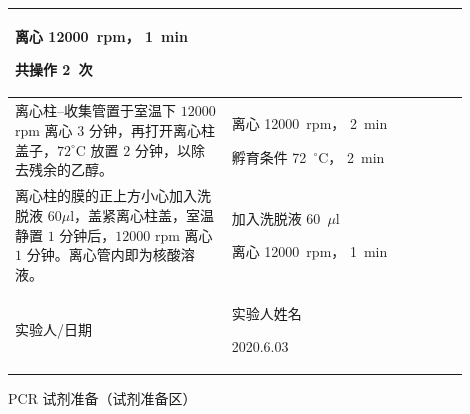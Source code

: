 \documentclass[UTF8,10pt,a4paper,fontset=fandol]{ctexart}
\newcommand{\fieldvalue}[1]{#1}
\newcommand{\handwritten}[1]{#1}
\begin{document}
\begin{tabular}{|p{0.43\linewidth}|p{0.47\linewidth}|}
离心
\fieldvalue{\handwritten{12000}}~rpm，
\fieldvalue{\handwritten{1}}~min

共操作
\fieldvalue{\handwritten{2}}~次
\\ \hline
离心柱--收集管置于室温下 $12000$ rpm 离心 $3$ 分钟，再打开离心柱盖子，$72^\circ$C 放置 $2$ 分钟，以除去残余的乙醇。 &
离心
\fieldvalue{\handwritten{12000}}~rpm，
\fieldvalue{\handwritten{2}}~min

孵育条件
\fieldvalue{\handwritten{72}}~$^\circ$C，
\fieldvalue{\handwritten{2}}~min
\\ \hline
离心柱的膜的正上方小心加入洗脱液 $60\mu$l，盖紧离心柱盖，室温静置 $1$ 分钟后，$12000$ rpm 离心 $1$ 分钟。离心管内即为核酸溶液。 &
加入洗脱液
\fieldvalue{\handwritten{60}}~$\mu$l

离心
\fieldvalue{\handwritten{12000}}~rpm，
\fieldvalue{\handwritten{1}}~min
\\ \hline
实验人/日期 &
\fieldvalue{\handwritten{实验人姓名}}

\fieldvalue{\handwritten{2020.6.03}}
\\ \hline
\end{tabular}

\begin{center}
PCR 试剂准备（试剂准备区）
\end{center}
\end{document}
